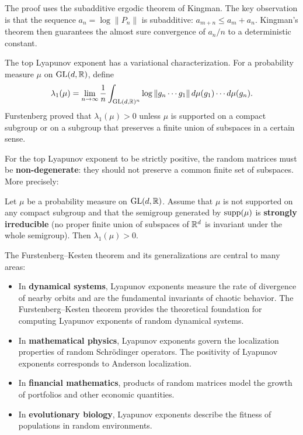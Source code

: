 The proof uses the subadditive ergodic theorem of Kingman. The key observation is that the sequence \(a_n = \log \|P_n\|\) is subadditive: \(a_{m+n} \leq a_m + a_n\). Kingman's theorem then guarantees the almost sure convergence of \(a_n/n\) to a deterministic constant.

The top Lyapunov exponent has a variational characterization. For a probability measure \(\mu\) on \(\operatorname{GL}(d,\mathbb{R})\), define
\[
\lambda_1(\mu) = \lim_{n \to \infty} \frac{1}{n} \int_{\operatorname{GL}(d,\mathbb{R})^n} \log \|g_n \cdots g_1\| \, d\mu(g_1) \cdots d\mu(g_n).
\]
Furstenberg proved that \(\lambda_1(\mu) > 0\) unless \(\mu\) is supported on a compact subgroup or on a subgroup that preserves a finite union of subspaces in a certain sense.

For the top Lyapunov exponent to be strictly positive, the random matrices must be \textbf{non-degenerate}: they should not preserve a common finite set of subspaces. More precisely:

\begin{theorem}
Let \(\mu\) be a probability measure on \(\operatorname{GL}(d,\mathbb{R})\). Assume that \(\mu\) is not supported on any compact subgroup and that the semigroup generated by \(\operatorname{supp}(\mu)\) is \textbf{strongly irreducible} (no proper finite union of subspaces of \(\mathbb{R}^d\) is invariant under the whole semigroup). Then \(\lambda_1(\mu) > 0\).
\end{theorem}

The Furstenberg--Kesten theorem and its generalizations are central to many areas:
\begin{itemize}
    \item In \textbf{dynamical systems}, Lyapunov exponents measure the rate of divergence of nearby orbits and are the fundamental invariants of chaotic behavior. The Furstenberg--Kesten theorem provides the theoretical foundation for computing Lyapunov exponents of random dynamical systems.
    \item In \textbf{mathematical physics}, Lyapunov exponents govern the localization properties of random Schr\"odinger operators. The positivity of Lyapunov exponents corresponds to Anderson localization.
    \item In \textbf{financial mathematics}, products of random matrices model the growth of portfolios and other economic quantities.
    \item In \textbf{evolutionary biology}, Lyapunov exponents describe the fitness of populations in random environments.
\end{itemize}

